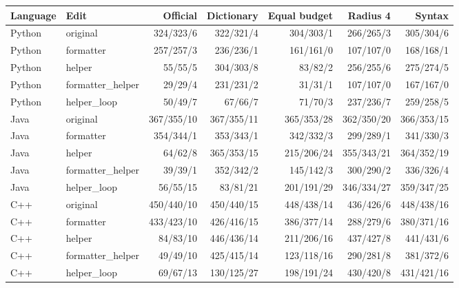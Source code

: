 \begin{tabular}{@{}llrrrrr@{}}
\toprule
Language & Edit & Official & Dictionary & Equal budget & Radius 4 & Syntax \\
\midrule
Python & original & 324/323/6 & 322/321/4 & 304/303/1 & 266/265/3 & 305/304/6 \\
Python & formatter & 257/257/3 & 236/236/1 & 161/161/0 & 107/107/0 & 168/168/1 \\
Python & helper & 55/55/5 & 304/303/8 & 83/82/2 & 256/255/6 & 275/274/5 \\
Python & formatter\_helper & 29/29/4 & 231/231/2 & 31/31/1 & 107/107/0 & 167/167/0 \\
Python & helper\_loop & 50/49/7 & 67/66/7 & 71/70/3 & 237/236/7 & 259/258/5 \\
Java & original & 367/355/10 & 367/355/11 & 365/353/28 & 362/350/20 & 366/353/15 \\
Java & formatter & 354/344/1 & 353/343/1 & 342/332/3 & 299/289/1 & 341/330/3 \\
Java & helper & 64/62/8 & 365/353/15 & 215/206/24 & 355/343/21 & 364/352/19 \\
Java & formatter\_helper & 39/39/1 & 352/342/2 & 145/142/3 & 300/290/2 & 336/326/4 \\
Java & helper\_loop & 56/55/15 & 83/81/21 & 201/191/29 & 346/334/27 & 359/347/25 \\
C++ & original & 450/440/10 & 450/440/15 & 448/438/14 & 436/426/6 & 448/438/16 \\
C++ & formatter & 433/423/10 & 426/416/15 & 386/377/14 & 288/279/6 & 380/371/16 \\
C++ & helper & 84/83/10 & 446/436/14 & 211/206/16 & 437/427/8 & 441/431/6 \\
C++ & formatter\_helper & 49/49/10 & 425/415/14 & 123/118/16 & 290/281/8 & 381/372/6 \\
C++ & helper\_loop & 69/67/13 & 130/125/27 & 198/191/24 & 430/420/8 & 431/421/16 \\
\bottomrule
\end{tabular}
